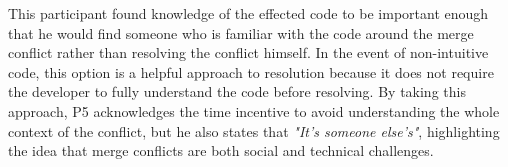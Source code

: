 This participant found knowledge of the effected code to be important enough that he would find someone who is familiar with the code around the merge conflict rather than resolving the conflict himself. In the event of non-intuitive code, this option is a helpful approach to resolution because it does not require the developer to fully understand the code before resolving. By taking this approach, P5 acknowledges the time incentive to avoid understanding the whole context of the conflict, but he also states that \textit{"It's someone else's"}, highlighting the idea that merge conflicts are both social and technical challenges.

%
%
%
